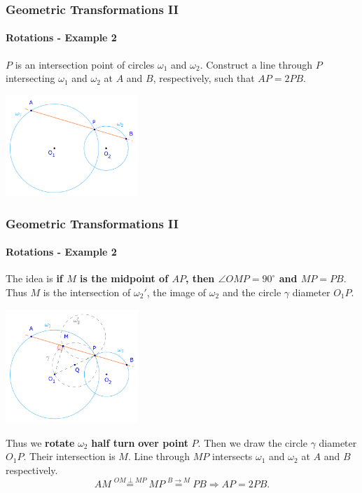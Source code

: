 \documentclass[8pt,xcolor=table,dvipsnames]{beamer}
\newcommand{\dg}{^\circ}
\begin{document}
\begin{frame}[t]
    \frametitle{Geometric Transformations II}
    \framesubtitle{Rotations - Example 2}
    \begin{example}
        $P$ is an intersection point of circles $\omega_1$ and $\omega_2$.
        Construct a line through $P$ intersecting $\omega_1$ and $\omega_2$ at $A$ and $B$, respectively,
        such that $AP = 2PB.$
    \end{example}

    \begin{center}
        \includegraphics[width=5cm]{./svg/pdf/rotation-2a.pdf}
    \end{center}
\end{frame}

\begin{frame}[t]
    \frametitle{Geometric Transformations II}
    \framesubtitle{Rotations - Example 2}
    The idea is \textbf{if $M$ is the midpoint of $AP$, then $\angle OMP = 90\dg$ and $MP = PB$}.
    Thus $M$ is the intersection of $\omega_2'$, the image of $\omega_2$ and the circle $\gamma$ diameter $O_1P.$
    \begin{center}
        \includegraphics[width=5cm]{./svg/pdf/rotation-2b.pdf}
    \end{center}
    Thus we \textbf{rotate} $\omega_2$ \textbf{half turn} \textbf{over point} $P$.
    Then we draw the circle $\gamma$ diameter $O_1P.$
    Their intersection is $M$. Line through $MP$ intersects $\omega_1$ and $\omega_2$ at $A$ and $B$ respectively.
    \[
        AM \stackrel{OM \perp MP}{=} MP \stackrel{B \rightarrow M}{=} PB \Rightarrow AP = 2PB.
    \]
\end{frame}
\end{document}
